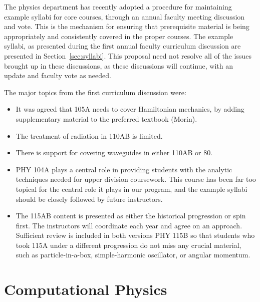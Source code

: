 \documentclass[12pt]{article}
\begin{document}
The physics department has recently adopted a procedure for
maintaining example syllabi for core courses, through an annual
faculty meeting discussion and vote.  This is the mechanism for
ensuring that prerequisite material is being appropriately and
consistently covered in the proper courses.  The example syllabi, as
presented during the first annual faculty curriculum discussion are
presented in Section~\ref{sec:syllabi}.  This proposal need not
resolve all of the issues brought up in these discussions, as these
discussions will continue, with an update and faculty vote as needed.

The major topics from the first curriculum discussion were:
\begin{itemize}
 \item It was agreed that 105A needs to cover Hamiltonian mechanics, by
   adding supplementary material to the preferred textbook (Morin).
 \item The treatment of radiation in 110AB is limited.
 \item There is support for covering waveguides in either 110AB or 80.   
 \item PHY 104A plays a central role in providing students with the
   analytic techniques needed for upper division coursework.  This
   course has been far too topical for the central role it plays in
   our program, and the example syllabi should be closely followed by
   future instructors.
 \item The 115AB content is presented as either the historical
   progression or spin first.  The instructors will coordinate each
   year and agree on an approach.  Sufficient review is included in
   both versions PHY 115B so that students who took 115A under a
   different progression do not miss any crucial material, such as
   particle-in-a-box, simple-harmonic oscillator, or angular momentum.

   
\end{itemize}

\section{Computational Physics}
\label{sec:computing}
\end{document}
